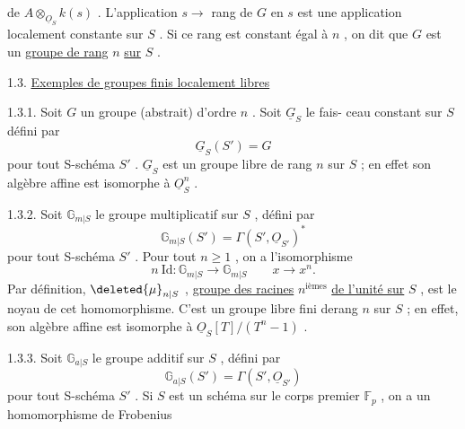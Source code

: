 
de $A \otimes_{\underline{O}_S} k(s)$ . L'application $s \to$ rang de $G$ en $s$ est une application
localement constante sur $S$ . Si ce rang est constant égal à
$n$ , on dit que $G$ est un \uline{groupe de rang} $n$ \uline{sur} $S$ .

1.3. \uline{Exemples de groupes finis localement libres}

1.3.1. Soit $G$ un groupe (abstrait) d'ordre $n$ . Soit $\underline{G}_S$ le fais-%
ceau constant sur $S$ défini par
\[ \underline{G}_S(S') = G \]
pour tout S-schéma $S'$ . $\underline{G}_S$ est un groupe libre de rang $n$ sur $S$ ; en
effet son algèbre affine est isomorphe à $\underline{O}_S^n$ .

1.3.2. Soit $\mathbb{G}_{m|S}$ le groupe multiplicatif sur $S$ , défini par
\[ \mathbb{G}_{m|S}(S') = \Gamma(S', \underline{O}_{S'})^* \]
pour tout S-schéma $S'$ . Pour tout $n \geq 1$ , on a l'isomorphisme
\[ n\ \mathrm{Id} : \mathbb{G}_{m|S} \to \mathbb{G}_{m|S} \qquad x \to x^n . \]
Par définition, $\deleted{\mu}_{n|S}$ , \uline{groupe des racines} $n^{\text{ièmes}}$ \uline{de l'unité sur} $S$ , est
le noyau de cet homomorphisme. C'est un groupe libre fini derang $n$ sur $S$ ;
en effet, son algèbre affine est isomorphe à $\underline{O}_S[T]/(T^n-1)$ .

1.3.3. Soit $\mathbb{G}_{a|S}$ le groupe additif sur $S$ , défini par
\[ \mathbb{G}_{a|S}(S') = \Gamma(S', \underline{O}_{S'}) \]
pour tout S-schéma $S'$ . Si $S$ est un schéma sur le corps premier $\mathbb{F}_p$ , on
a un homomorphisme de Frobenius

